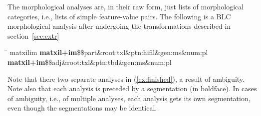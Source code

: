 The morphological analyses are, in their raw form, just lists of morphological categories, 
i.e., lists of simple feature-value pairs.
The following is a BLC morphological analysis after undergoing the transformations 
described in section~\ref{sec:extr}
\begin{exe} 
\ex \label{ex:finished}
\begin{tabbing}
\hspace{0.8in} \= \hspace{5.5in} \kill
\textsf{matxilim} \> \textsf{\textbf{matxil+im}\$\$part\&root:txl\&ptn:hifil\&gen:ms\&num:pl}\, \\
\> \textsf{\textbf{matxil+im}\$\$adj\&root:txl\&ptn:tbd\&gen:ms\&num:pl}
\end{tabbing}
\end{exe}
Note that there two separate analyses in (\ref{ex:finished}), a result of ambiguity. Note also that each analysis is preceded by a segmentation (in boldface). In cases of ambiguity, i.e., of multiple analyses, each analysis gets its own segmentation, even though
the segmentations may be identical.

